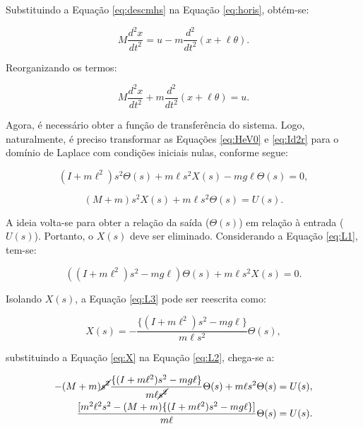 \documentclass[12pt,           %
a4paper,                       %
openany,                       %
oneside,                       %
chapter=TITLE,                 %
english,                       %
spanish,                       %
brazil,                        %
sumario=tradicional]{abntex2}  %
\begin{document}
\begin{OnehalfSpace}
Substituindo a Equação \ref{eq:descmhs} na Equação \ref{eq:horis}, obtém-se:

\begin{equation}
    M\frac{d^2x}{dt^2}  = u -  m\frac{d^2}{dt^2} (x + \ell\theta).
    \label{eq:Id2r}
\end{equation}

Reorganizando os termos:

\begin{equation}
    M\frac{d^2x}{dt^2} + m\frac{d^2}{dt^2} (x + \ell\theta) = u.
    \label{eq:Id2r}
\end{equation}

Agora, é necessário obter a função de transferência do sistema. Logo, naturalmente, é preciso transformar as Equações \ref{eq:HeV0} e \ref{eq:Id2r} para o domínio de Laplace com condições iniciais nulas, conforme segue:

\begin{equation}
    (I + m\ell^2)s^2\Theta(s) + m\ell s^2 X(s) - mg\ell\Theta(s) = 0,
    \label{eq:L1}
\end{equation}

\begin{equation}
    (M+m)s^2 X(s) + m\ell s^2\Theta(s) = U(s).
    \label{eq:L2}
\end{equation}

A ideia volta-se para obter a relação da saída ($\Theta (s)$) em relação à entrada ($U(s)$). Portanto, o $X(s)$ deve ser eliminado. Considerando a Equação \ref{eq:L1}, tem-se:

\begin{equation}
    ((I + m\ell^2)s^2 - mg\ell)\Theta(s) + m\ell s^2 X(s) = 0.
    \label{eq:L3}
\end{equation}

Isolando $X(s)$, a Equação \ref{eq:L3} pode ser reescrita como:

\begin{equation}
    X(s) = -\frac{\{(I+m\ell^2)s^2-mg\ell\}}{m\ell s^2} \Theta (s),
    \label{eq:X}
\end{equation}

\noindent substituindo a Equação \ref{eq:X} na Equação \ref{eq:L2}, chega-se a:

\begin{equation}
    \begin{split}
        -(M+m)\cancel{s^2} \frac{\{(I+m\ell^2)s^2-mg\ell\}}{m\ell \cancel{s^2}} \Theta (s) + m\ell s^2\Theta(s) = U(s),\\
        \frac{[m^2\ell^2 s^2 - (M+m)\{(I+m\ell^2)s^2-mg\ell\}]}{m\ell}\Theta (s) = U(s).
    \end{split}
    \label{eq:TF1}
\end{equation}


\end{OnehalfSpace}
\end{document}
